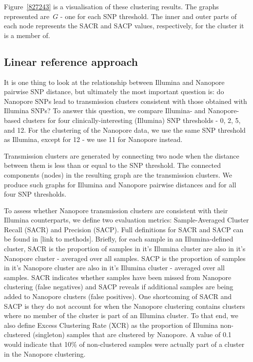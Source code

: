 Figure~{\ref{827243}} is a visualisation of these
clustering results. The graphs represented are~\(G\) - one
for each SNP threshold. The inner and outer parts of each node
represents the SACR and SACP values, respectively, for the cluster it is
a member of.~

\subsection{Linear reference approach}

It is one thing to look at the relationship between Illumina and
Nanopore pairwise SNP distance, but ultimately the most important
question is: do Nanopore SNPs lead to transmission clusters consistent
with those obtained with Illumina SNPs? To answer this question, we
compare Illumina- and Nanopore-based clusters for{ four
clinically-interesting (Illumina) SNP thresholds -} 0, 2, 5, and 12. For
the clustering of the Nanopore data, we use the same SNP threshold as
Illumina, except for 12 - we use 11 for Nanopore instead.

Transmission clusters are generated by connecting two node when the
distance between them is less than or equal to the SNP threshold. The
connected components (nodes) in the resulting graph are the transmission
clusters. We produce such graphs for Illumina and Nanopore pairwise
distances and for all four SNP thresholds.

To assess whether Nanopore transmission clusters are consistent with
their Illumina counterparts, we define two evaluation metrics:
Sample-Averaged Cluster Recall (SACR) and Precision (SACP). Full
definitions for SACR and SACP can be found in {[}link to methods{]}.
Briefly, for each sample in an Illumina-defined cluster, SACR is the
proportion of samples in it's Illumina cluster are also in it's Nanopore
cluster - averaged over all samples. SACP is the proportion of samples
in it's Nanopore cluster are also in it's Illumina cluster - averaged
over all samples. SACR indicates whether samples have been missed from
Nanopore clustering (false negatives) and SACP reveals if additional
samples are being added to Nanopore clusters (false positives). One
shortcoming of SACR and SACP is they do not account for when the
Nanopore clustering contains clusters where no member of the cluster is
part of an Illumina cluster. To that end, we also define Excess
Clustering Rate (XCR) as the proportion of Illumina non-clustered
(singleton) samples that are clustered by Nanopore. A value of 0.1 would
indicate that 10\% of non-clustered samples were actually part of a
cluster in the Nanopore clustering.

